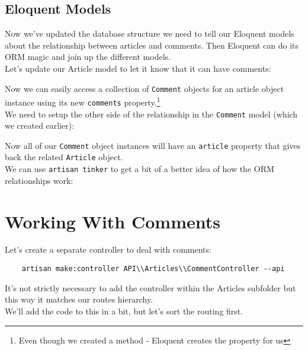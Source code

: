 \subsection{Eloquent Models}

Now we've updated the database structure we need to tell our Eloquent models about the relationship between articles and comments. Then Eloquent can do its ORM magic and join up the different models.
\\

Let's update our Article model to let it know that it can have comments:


Now we can easily access a collection of \texttt{Comment} objects for an article object instance using its new \texttt{comments} property.\footnote{Even though we created a method - Eloquent creates the property for us}
\\

We need to setup the other side of the relationship in the \texttt{Comment} model (which we created earlier):


Now all of our \texttt{Comment} object instances will have an \texttt{article} property that gives back the related \texttt{Article} object.
\\

We can use \texttt{artisan tinker} to get a bit of a better idea of how the ORM relationships work:



\section{Working With Comments}

Let's create a separate controller to deal with comments:

\begin{verbatim}
    artisan make:controller API\\Articles\\CommentController --api
\end{verbatim}

It's not strictly necessary to add the controller within the Articles subfolder but this way it matches our routes hierarchy.
\\

We'll add the code to this in a bit, but let's sort the routing first.



